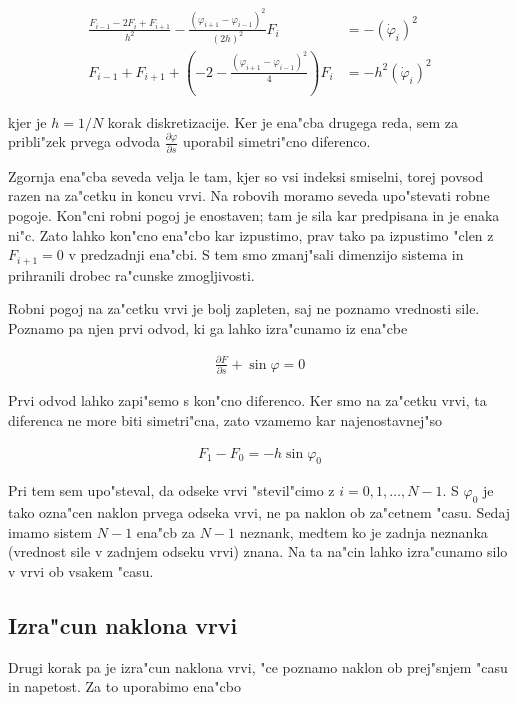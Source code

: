 \documentclass[a4paper,10pt]{article}
\renewcommand{\phi}{\varphi}
\newcommand{\parcialno}[2]{
  \frac{\partial #1}{\partial #2}
}
\begin{document}
\begin{align}
 \label{eq:sila-diskretno}
 \frac{F_{i-1} - 2F_i + F_{i+1}}{h^2} - \frac{(\phi_{i+1} - \phi_{i-1})^2}{(2h)^2}F_i &= -\left(\dot\phi_i\right)^2 \\
 F_{i-1} + F_{i+1} + \left(-2 - \frac{(\phi_{i+1} - \phi_{i-1})^2}{4}\right) F_i &= -h^2 \left(\dot\phi_i\right)^2
\end{align}

kjer je $h=1/N$ korak diskretizacije. Ker je ena"cba drugega reda, sem za pribli"zek prvega odvoda $\parcialno{\phi}{s}$ uporabil simetri"cno diferenco. 

Zgornja ena"cba seveda velja le tam, kjer so vsi indeksi smiselni, torej povsod razen na za"cetku in koncu vrvi. Na robovih moramo seveda upo"stevati robne pogoje. Kon"cni robni pogoj je enostaven; tam je sila kar predpisana in je enaka ni"c. Zato lahko kon"cno ena"cbo kar izpustimo, prav tako pa izpustimo "clen z $F_{i+1} = 0$ v predzadnji ena"cbi. S tem smo zmanj"sali dimenzijo sistema in prihranili drobec ra"cunske zmogljivosti. 

Robni pogoj na za"cetku vrvi je bolj zapleten, saj ne poznamo vrednosti sile. Poznamo pa njen prvi odvod, ki ga lahko izra"cunamo iz ena"cbe 

\begin{align}
\label{eq:sila-zacetni-pogoj}
 \parcialno{F}{s} + \sin\phi = 0
\end{align}

Prvi odvod lahko zapi"semo s kon"cno diferenco. Ker smo na za"cetku vrvi, ta diferenca ne more biti simetri"cna, zato vzamemo kar najenostavnej"so

\begin{align}
\label{eq:sila-zacetni-pogoj-diskretno}
 F_1 - F_0 = -h\sin\phi_0
\end{align}

Pri tem sem upo"steval, da odseke vrvi "stevil"cimo z $i=0,1,\ldots,N-1$. S $\phi_0$ je tako ozna"cen naklon prvega odseka vrvi, ne pa naklon ob za"cetnem "casu. Sedaj imamo sistem $N-1$ ena"cb za $N-1$ neznank, medtem ko je zadnja neznanka (vrednost sile v zadnjem odseku vrvi) znana. Na ta na"cin lahko izra"cunamo silo v vrvi ob vsakem "casu. 

\subsection{Izra"cun naklona vrvi}

Drugi korak pa je izra"cun naklona vrvi, "ce poznamo naklon ob prej"snjem "casu in napetost. Za to uporabimo ena"cbo
\end{document}

